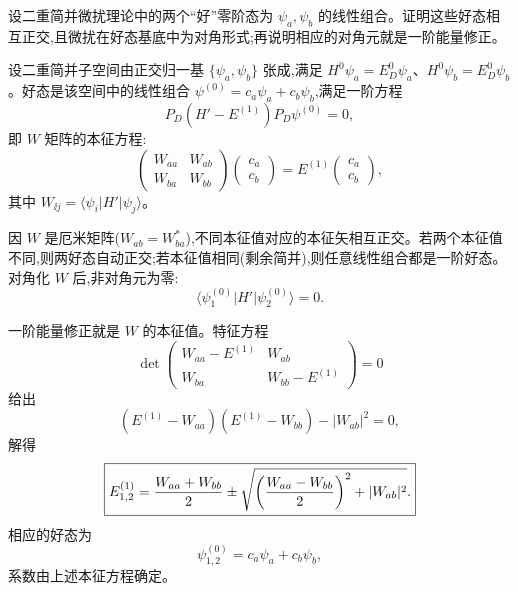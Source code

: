\begin{question}
设二重简并微扰理论中的两个“好”零阶态为 $\psi_a,\psi_b$ 的线性组合。证明这些好态相互正交,且微扰在好态基底中为对角形式;再说明相应的对角元就是一阶能量修正。
\begin{solution}
设二重简并子空间由正交归一基 $\{\psi_a,\psi_b\}$ 张成,满足 $H^0\psi_a=E_D^0\psi_a$、$H^0\psi_b=E_D^0\psi_b$。好态是该空间中的线性组合 $\psi^{(0)}=c_a\psi_a+c_b\psi_b$,满足一阶方程
\[
P_D(H'-E^{(1)})P_D\psi^{(0)}=0,
\]
即 $W$ 矩阵的本征方程:
\[
\begin{pmatrix}W_{aa}&W_{ab}\\ W_{ba}&W_{bb}\end{pmatrix}
\begin{pmatrix}c_a\\c_b\end{pmatrix}
=E^{(1)}\begin{pmatrix}c_a\\c_b\end{pmatrix},
\]
其中 $W_{\ii j}=\langle\psi_i|H'|\psi_j\rangle$。

因 $W$ 是厄米矩阵($W_{ab}=W_{ba}^*$),不同本征值对应的本征矢相互正交。若两个本征值不同,则两好态自动正交;若本征值相同(剩余简并),则任意线性组合都是一阶好态。对角化 $W$ 后,非对角元为零:
\[
\langle\psi_1^{(0)}|H'|\psi_2^{(0)}\rangle=0.
\]

一阶能量修正就是 $W$ 的本征值。特征方程
\[
\det\begin{pmatrix}W_{aa}-E^{(1)}&W_{ab}\\ W_{ba}&W_{bb}-E^{(1)}\end{pmatrix}=0
\]
给出
\[
(E^{(1)}-W_{aa})(E^{(1)}-W_{bb})-|W_{ab}|^2=0,
\]
解得
\[
\boxed{E_{1,2}^{(1)}={W_{aa}+W_{bb}\over2}
\pm\sqrt{\left({W_{aa}-W_{bb}\over2}\right)^2+|W_{ab}|^2}.}
\]
相应的好态为
\[
\psi_{1,2}^{(0)}=c_a\psi_a+c_b\psi_b,
\]
系数由上述本征方程确定。
\end{solution}
\end{question}

